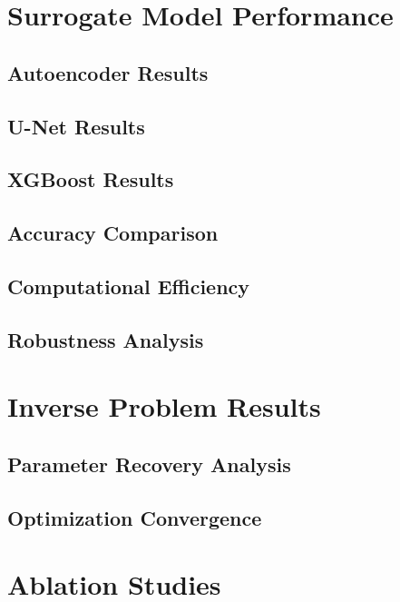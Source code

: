 \documentclass[12pt,a4paper]{report}
\begin{document}
\section{Surrogate Model Performance}




\subsection{Autoencoder Results}


\subsection{U-Net Results}


\subsection{XGBoost Results}






\subsection{Accuracy Comparison}


\subsection{Computational Efficiency}


\subsection{Robustness Analysis}


\section{Inverse Problem Results}

\subsection{Parameter Recovery Analysis}

\subsection{Optimization Convergence}


\section{Ablation Studies}
\end{document}
